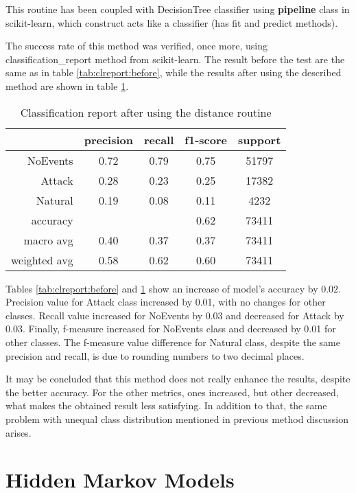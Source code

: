 This routine has been coupled with DecisionTree classifier using \textbf{pipeline} class in scikit-learn, which construct acts like a classifier (has fit and predict methods). 

The success rate of this method was verified, once more, using classification\_report method from scikit-learn. The result before the test are the same as in table \ref{tab:clreport:before}, while the results after using the described method are shown in table \ref{tab:distrep}.

\begin{table}[H]
    \centering
    \caption{Classification report after using the distance routine} \label{tab:distrep}
    \begin{tabular}{rcccc}\toprule
     &   precision    &recall & f1-score &  support  \\\midrule

        NoEvents    &   0.72   &   0.79   &   0.75  &   51797 \\
          Attack    &   0.28   &   0.23   &   0.25  &   17382 \\
         Natural   &    0.19   &   0.08   &   0.11  &    4232 \\
    
        accuracy    &           &         &   0.62   &  73411 \\
       macro avg    &   0.40    &  0.37   &   0.37  &   73411 \\
    weighted avg   &   0.58   &   0.62   &   0.60   &  73411   \\  \bottomrule
    \end{tabular}
\end{table}

Tables \ref{tab:clreport:before} and \ref{tab:distrep} show an increase of model's accuracy by $0.02$. Precision value for Attack class increased by 0.01, with no changes for other classes. Recall value increased for NoEvents by 0.03 and decreased for Attack by 0.03. Finally, f-measure increased for NoEvents class and decreased by 0.01 for other classes. The f-measure value difference for Natural class, despite the same precision and recall, is due to rounding numbers to two decimal places. 

It may be concluded that this method does not really enhance the results, despite the better accuracy. For the other metrics, ones increased, but other decreased, what makes the obtained result less satisfying. In addition to that, the same problem with unequal class distribution mentioned in previous method discussion arises. 
\section{Hidden Markov Models}
